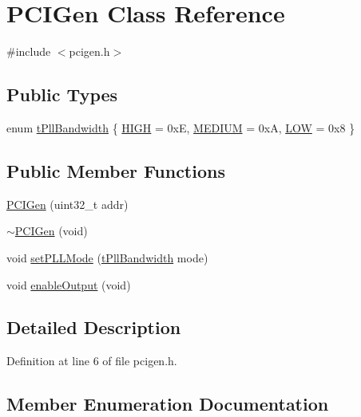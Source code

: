 \hypertarget{class_p_c_i_gen}{}\section{P\+C\+I\+Gen Class Reference}
\label{class_p_c_i_gen}


{\ttfamily \#include $<$pcigen.\+h$>$}

\subsection*{Public Types}
\begin{DoxyCompactItemize}
\item 
enum \hyperlink{class_p_c_i_gen_a120a33b67985d3ea5183e63a5ed483cd}{t\+Pll\+Bandwidth} \{ \hyperlink{class_p_c_i_gen_a120a33b67985d3ea5183e63a5ed483cda8d14f46e08d6be841b697e3fccc85cbf}{H\+I\+GH} = 0xE, 
\hyperlink{class_p_c_i_gen_a120a33b67985d3ea5183e63a5ed483cdaa49b360cc46b8f0a4762c9c247fe6a84}{M\+E\+D\+I\+UM} = 0xA, 
\hyperlink{class_p_c_i_gen_a120a33b67985d3ea5183e63a5ed483cda269e480a6ebccc50f72bb297cf3883e2}{L\+OW} = 0x8
 \}
\end{DoxyCompactItemize}
\subsection*{Public Member Functions}
\begin{DoxyCompactItemize}
\item 
\hyperlink{class_p_c_i_gen_a5ed7c531563f7a5a85d883bc70e09ca6}{P\+C\+I\+Gen} (uint32\+\_\+t addr)
\item 
\hyperlink{class_p_c_i_gen_af58edcfbfcc7582ab50283d84c384115}{$\sim$\+P\+C\+I\+Gen} (void)
\item 
void \hyperlink{class_p_c_i_gen_aa15c963d18c21e01735f460065c24e06}{set\+P\+L\+L\+Mode} (\hyperlink{class_p_c_i_gen_a120a33b67985d3ea5183e63a5ed483cd}{t\+Pll\+Bandwidth} mode)
\item 
void \hyperlink{class_p_c_i_gen_a8c626e3645b3b8eb3f6e0b8a7f0b4960}{enable\+Output} (void)
\end{DoxyCompactItemize}


\subsection{Detailed Description}


Definition at line 6 of file pcigen.\+h.



\subsection{Member Enumeration Documentation}
